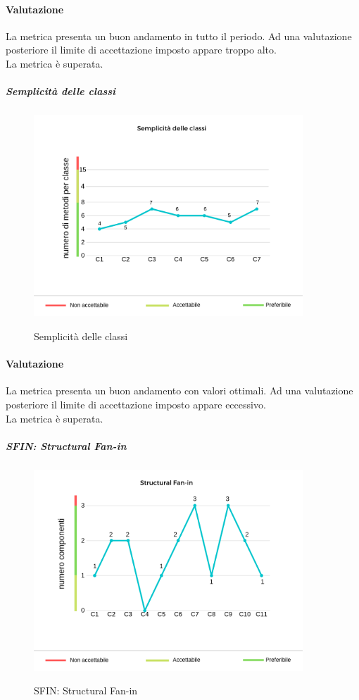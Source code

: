 	\paragraph*{Valutazione} La metrica presenta un buon andamento in tutto il periodo. Ad una valutazione posteriore il limite di accettazione imposto appare troppo alto.
	\\ La metrica è superata.
	\pagebreak
	\subparagraph{Semplicità delle classi}
	\begin{center}
		\begin{figure}[h] 
			\centering 
			\includegraphics[width=0.90\textwidth]{res/images/new/semplicitaClassi.png}\\
			\caption{Semplicità delle classi}
		\end{figure}
	\end{center}
	\paragraph*{Valutazione} La metrica presenta un buon andamento con valori ottimali. Ad una valutazione posteriore il limite di accettazione imposto appare eccessivo. 
	\\ La metrica è superata.
	\pagebreak
	\subparagraph{SFIN: Structural Fan-in}
	\begin{center}
		\begin{figure}[h] 
			\centering 
			\includegraphics[width=0.90\textwidth]{res/images/new/sfin.png}\\
			\caption{SFIN: Structural Fan-in}
		\end{figure}
	\end{center}
